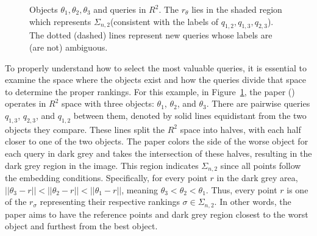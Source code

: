 \documentclass[
  letterpaper,
  numbers=noenddot,
  DIV=11]{scrreprt}
\theoremstyle{definition}
\theoremstyle{plain}
\theoremstyle{plain}
\theoremstyle{remark}
\begin{document}
\begin{figure}


\caption{\label{fig-dim-space}Objects \(\theta_1, \theta_2, \theta_3\)
and queries in \(R^2\). The \(r_\theta\) lies in the shaded region which
represents \(\Sigma_{n,2}\)(consistent with the labels of
\(q_{1,2}, q_{1,3}, q_{2,3}\)). The dotted (dashed) lines represent new
queries whose labels are (are not) ambiguous.}

\end{figure}%

To properly understand how to select the most valuable queries, it is
essential to examine the space where the objects exist and how the
queries divide that space to determine the proper rankings. For this
example, in Figure~\ref{fig-dim-space}, the paper
() operates in \(R^2\) space
with three objects: \(\theta_1\), \(\theta_2\), and \(\theta_3\). There
are pairwise queries \(q_{1,3}\), \(q_{2,3}\), and \(q_{1,2}\) between
them, denoted by solid lines equidistant from the two objects they
compare. These lines split the \(R^2\) space into halves, with each half
closer to one of the two objects. The paper colors the side of the worse
object for each query in dark grey and takes the intersection of these
halves, resulting in the dark grey region in the image. This region
indicates \(\Sigma_{n,2}\) since all points follow the embedding
conditions. Specifically, for every point \(r\) in the dark grey area,
\(||\theta_3 - r|| < ||\theta_2 - r|| < ||\theta_1 - r||\), meaning
\(\theta_3 < \theta_2 < \theta_1\). Thus, every point \(r\) is one of
the \(r_\sigma\) representing their respective rankings
\(\sigma \in \Sigma_{n,2}\). In other words, the paper aims to have the
reference points and dark grey region closest to the worst object and
furthest from the best object.
\end{document}
